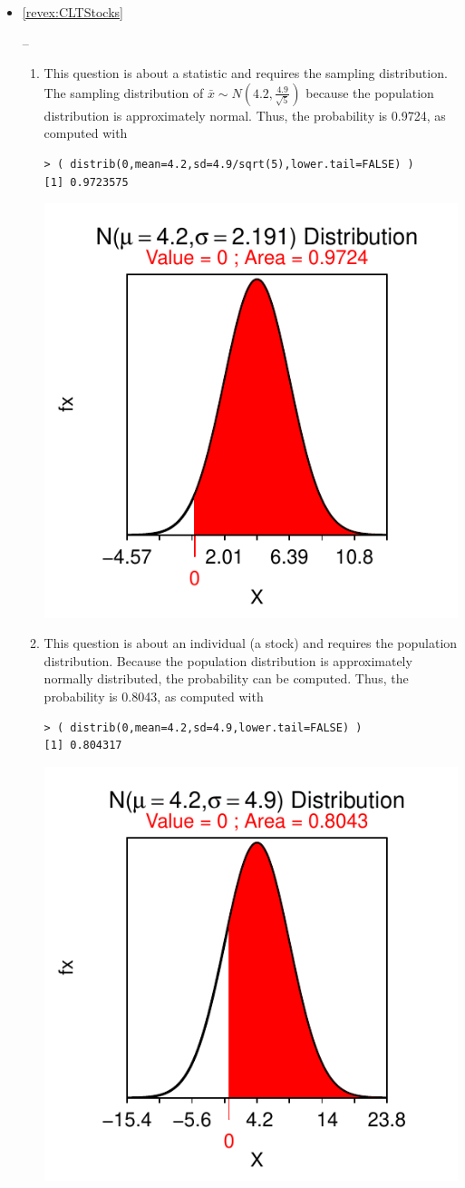 \documentclass[10pt,openany]{book}\usepackage[]{graphicx}\usepackage[]{color}
\makeatletter
\newenvironment{kframe}{%
 \def\at@end@of@kframe{}%
 \ifinner\ifhmode%
  \def\at@end@of@kframe{\end{minipage}}%
  \begin{minipage}{\columnwidth}%
 \fi\fi%
 \def\FrameCommand##1{\hskip\@totalleftmargin \hskip-\fboxsep
 \colorbox{shadecolor}{##1}\hskip-\fboxsep
     \hskip-\linewidth \hskip-\@totalleftmargin \hskip\columnwidth}%
 \MakeFramed {\advance\hsize-\width
   \@totalleftmargin\z@ \linewidth\hsize
   \@setminipage}}%
 {\par\unskip\endMakeFramed%
 \at@end@of@kframe}
\newenvironment{knitrout}{}{} %
\makeatother
\begin{document}
\begin{itemize}
\begin{enumerate}
\begin{knitrout}
\end{knitrout}
    \end{enumerate}
  \item \hypertarget{ans:CLTStocks}{\ref{revex:CLTStocks}} --
    \begin{enumerate}
       \item This question is about a statistic and requires the sampling distribution.  The sampling distribution of $\bar{x}\sim N(4.2,\frac{4.9}{\sqrt{5}})$ because the population distribution is approximately normal.  Thus, the probability is 0.9724, as computed with
\begin{knitrout}
\color{fgcolor}\begin{kframe}
\begin{verbatim}
> ( distrib(0,mean=4.2,sd=4.9/sqrt(5),lower.tail=FALSE) )
[1] 0.9723575
\end{verbatim}
\end{kframe}

{\centering \includegraphics[width=.4\linewidth]{Figs/unnamed-chunk-313-1} 

}



\end{knitrout}
       \item This question is about an individual (a stock) and requires the population distribution. Because the population distribution is approximately normally distributed, the probability can be computed.  Thus, the probability is 0.8043, as computed with
\begin{knitrout}
\color{fgcolor}\begin{kframe}
\begin{verbatim}
> ( distrib(0,mean=4.2,sd=4.9,lower.tail=FALSE) )
[1] 0.804317
\end{verbatim}
\end{kframe}

{\centering \includegraphics[width=.4\linewidth]{Figs/unnamed-chunk-314-1} 

}
\end{knitrout}
\end{enumerate}
\end{itemize}
\end{document}

